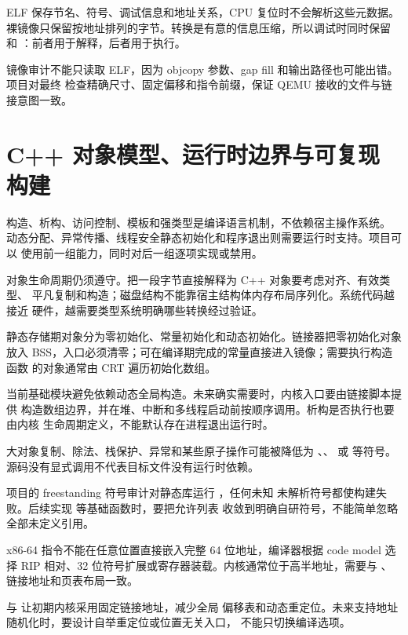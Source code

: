 ELF 保存节名、符号、调试信息和地址关系，CPU 复位时不会解析这些元数据。
裸镜像只保留按地址排列的字节。转换是有意的信息压缩，所以调试时同时保留
 和 ：前者用于解释，后者用于执行。

镜像审计不能只读取 ELF，因为 objcopy 参数、gap fill 和输出路径也可能出错。
项目对最终  检查精确尺寸、固定偏移和指令前缀，保证
QEMU 接收的文件与链接意图一致。

\section{C++ 对象模型、运行时边界与可复现构建}

构造、析构、访问控制、模板和强类型是编译语言机制，不依赖宿主操作系统。
动态分配、异常传播、线程安全静态初始化和程序退出则需要运行时支持。项目可以
使用前一组能力，同时对后一组逐项实现或禁用。

对象生命周期仍须遵守。把一段字节直接解释为 C++ 对象要考虑对齐、有效类型、
平凡复制和构造；磁盘结构不能靠宿主结构体内存布局序列化。系统代码越接近
硬件，越需要类型系统明确哪些转换经过验证。

静态存储期对象分为零初始化、常量初始化和动态初始化。链接器把零初始化对象
放入 BSS，入口必须清零；可在编译期完成的常量直接进入镜像；需要执行构造函数
的对象通常由 CRT 遍历初始化数组。

当前基础模块避免依赖动态全局构造。未来确实需要时，内核入口要由链接脚本提供
构造数组边界，并在堆、中断和多线程启动前按顺序调用。析构是否执行也要由内核
生命周期定义，不能默认存在进程退出运行时。

大对象复制、除法、栈保护、异常和某些原子操作可能被降低为
、、 或
 等符号。源码没有显式调用不代表目标文件没有运行时依赖。

项目的 freestanding 符号审计对静态库运行 ，任何未知
未解析符号都使构建失败。后续实现  等基础函数时，要把允许列表
收敛到明确自研符号，不能简单忽略全部未定义引用。

x86-64 指令不能在任意位置直接嵌入完整 64 位地址，编译器根据 code model
选择 RIP 相对、32 位符号扩展或寄存器装载。内核通常位于高半地址，需要与
、链接地址和页表布局一致。

 与  让初期内核采用固定链接地址，减少全局
偏移表和动态重定位。未来支持地址随机化时，要设计自举重定位或位置无关入口，
不能只切换编译选项。

